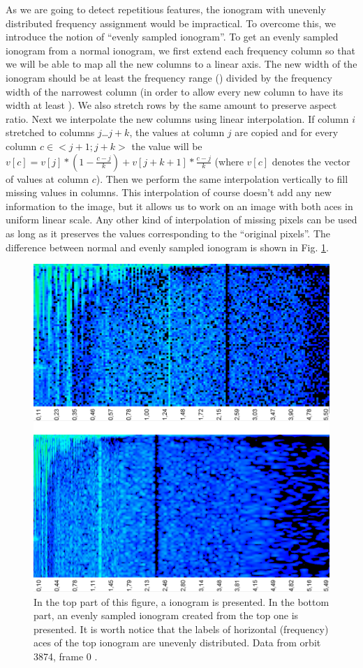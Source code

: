 As we are going to detect repetitious features, the ionogram with unevenly distributed frequency assignment would be impractical. To overcome this, we introduce the notion of ``evenly sampled ionogram''. To get an evenly sampled ionogram from a normal ionogram, we first extend each frequency column so that we will be able to map all the new columns to a linear axis. The new width of the ionogram should be at least the frequency range () divided by the frequency width of the narrowest column (in order to allow every new column to have its width at least ). We also stretch rows by the same amount to preserve aspect ratio. Next we interpolate the new columns using linear interpolation. If column $i$ stretched to columns $j$\ldots$j+k$, the values at column $j$ are copied and for every column $c\in<j+1; j+k>$ the value will be $v[c] = v[j]*(1-\frac{c-j}{k}) + v[j+k+1]*\frac{c-j}{k}$ (where $v[c]$ denotes the vector of values at column $c$). Then we perform the same interpolation vertically to fill missing values in columns. This interpolation of course doesn't add any new information to the image, but it allows us to work on an image with both aces in uniform linear scale. Any other kind of interpolation of missing pixels can be used as long as it preserves the values corresponding to the ``original pixels''. The difference between normal and evenly sampled ionogram is shown in Fig. \ref{fig:even_uneven_iono}.

\begin{figure}
	\centering
	\includegraphics[width=140mm]{images/even_and_uneven_ionogram.png}
	\caption{In the top part of this figure, a ionogram is presented. In the bottom part, an evenly sampled ionogram created from the top one is presented. It is worth notice that the labels of horizontal (frequency) aces of the top ionogram are unevenly distributed. Data from orbit 3874, frame 0 \citep{FTP}.}
	\label{fig:even_uneven_iono}
\end{figure}

